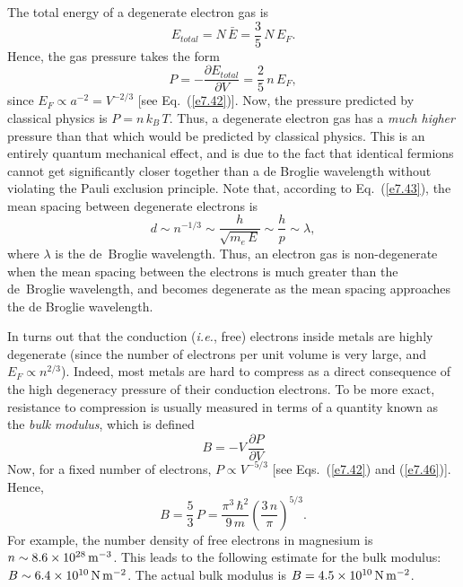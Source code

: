 The total energy of a degenerate electron gas is
\begin{equation}
E_{total} = N\,\bar{E} = \frac{3}{5}\,N\,E_F.
\end{equation}
Hence, the gas pressure takes the form
\begin{equation}\label{e7.46}
P = -\frac{\partial E_{total}}{\partial V} = \frac{2}{5}\,n\,E_F,
\end{equation}
since $E_F\propto a^{-2}=V^{-2/3}$ [see Eq.~(\ref{e7.42})].
Now, the pressure predicted by classical physics is $P= n\,k_B\,T$. 
Thus, a degenerate electron gas has a {\em much higher}\/ pressure than
that which would be predicted by classical physics. This is an entirely
quantum mechanical effect, and is due to the fact that identical fermions
cannot get significantly closer together than a de Broglie wavelength
without violating the Pauli exclusion principle. Note that, according to
Eq.~(\ref{e7.43}), the mean spacing between degenerate electrons is
\begin{equation}
d\sim n^{-1/3}\sim \frac{h}{\sqrt{m_e\,E}}\sim \frac{h}{p}\sim \lambda,
\end{equation}
where $\lambda$ is the de~Broglie wavelength. Thus, an electron gas
is non-degener\-ate when the mean spacing between the electrons is much
greater than the de~Broglie wavelength, and becomes degenerate as the
mean spacing approaches the de Broglie wavelength.

In turns out that the conduction ({\em i.e.}, free) electrons inside metals are
highly degenerate (since the number of electrons per unit volume
is very large, and $E_F\propto n^{2/3}$). Indeed, most metals are hard to compress
as a direct consequence of the high degeneracy pressure of their conduction
electrons. To be more exact, resistance to compression is usually measured
in terms of a quantity known as the {\em bulk modulus}, which is defined
\begin{equation}
B = - V\,\frac{\partial P}{\partial V}
\end{equation}
Now, for a fixed number of electrons, $P\propto V^{-5/3}$ [see Eqs.~(\ref{e7.42}) and (\ref{e7.46})]. Hence,
\begin{equation}
B = \frac{5}{3}\,P = \frac{\pi^3\,\hbar^2}{9\,m}\left(\frac{3\,n}{\pi}\right)^{5/3}.
\end{equation}
For example, the number density of free electrons in magnesium is
$n\sim 8.6\times 10^{28}\,{\rm m}^{-3}$. This leads to the following estimate
for the bulk modulus: $B\sim 6.4\times 10^{10}\,{\rm N}\,{\rm m}^{-2}$.
The actual bulk modulus is $B= 4.5\times 10^{10}\,{\rm N}\,{\rm m}^{-2}$.

